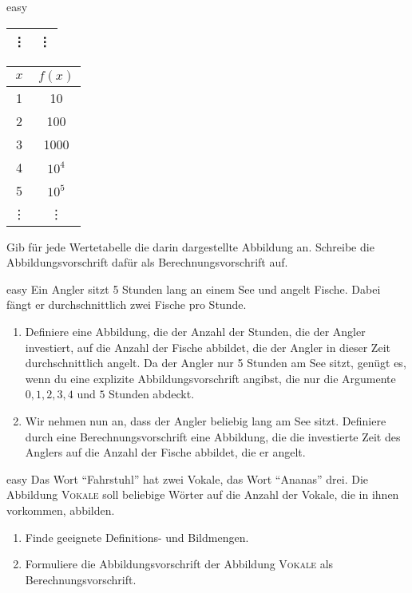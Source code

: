 \documentclass[../abbildungen.tex]{subfiles}
\begin{document}
\begin{exercise}{easy}
\begin{multicols}{5}
\begin{center}
\begin{tabular}{cc}
            \vdots & \vdots\\\bottomrule
        \end{tabular}
        \begin{tabular}{cc}\toprule
            $x$ & $f(x)$ \\\midrule
            1 & 10\\
            2 & 100\\
            3 & 1000\\
            4 & $10^4$\\
            5 & $10^5$\\
            \vdots & \vdots\\\bottomrule
        \end{tabular}
    \end{center}
\end{multicols}
    Gib für jede Wertetabelle die darin dargestellte Abbildung an. Schreibe die Abbildungsvorschrift dafür als Berechnungsvorschrift auf.
\end{exercise}
\begin{exercise}{easy}
    Ein Angler sitzt 5 Stunden lang an einem See und angelt Fische. Dabei fängt er durchschnittlich zwei Fische pro Stunde.
    \begin{enumerate}
        \item Definiere eine Abbildung, die der Anzahl der Stunden, die der Angler investiert, auf die Anzahl der Fische abbildet, die der Angler in dieser Zeit durchschnittlich angelt. Da der Angler nur 5 Stunden am See sitzt, genügt es, wenn du eine explizite Abbildungsvorschrift angibst, die nur die Argumente $0, 1, 2, 3, 4$ und $5$ Stunden abdeckt.
        \item Wir nehmen nun an, dass der Angler beliebig lang am See sitzt. Definiere durch eine Berechnungsvorschrift eine Abbildung, die die investierte Zeit des Anglers auf die Anzahl der Fische abbildet, die er angelt.
    \end{enumerate}
\end{exercise}
\begin{exercise}{easy}
    Das Wort \enquote{Fahrstuhl} hat zwei Vokale, das Wort \enquote{Ananas} drei. Die Abbildung \textsc{Vokale} soll beliebige Wörter auf die Anzahl der Vokale, die in ihnen vorkommen, abbilden.
    \begin{enumerate}
        \item Finde geeignete Definitions- und Bildmengen.
        \item Formuliere die Abbildungsvorschrift der Abbildung \textsc{Vokale} als Berechnungsvorschrift.
    \end{enumerate}
\end{exercise}
\end{document}
